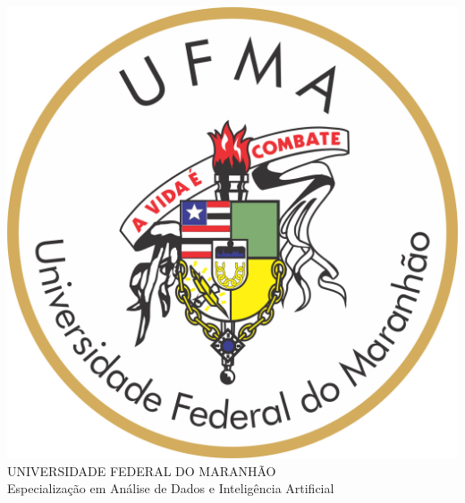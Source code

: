 \documentclass[
12pt,				%
openright,			%
oneside,			%
a4paper,			%
english,			%
french,				%
spanish,			%
brazil				%
]{abntex2}
\begin{document}

\frenchspacing 

\renewcommand{\imprimircapa}{%
\begin{capa}%
\center
\includegraphics[scale=0.25]{imagens/logoufma.png} \\ 
\vspace{1cm}
\ABNTEXchapterfont\Large UNIVERSIDADE FEDERAL DO MARANHÃO \\
\ABNTEXsectionfont\Large Especialização em Análise de Dados e Inteligência Artificial \\

\vspace*{5cm}

\begin{center}
{\ABNTEXsectionfont\Large\imprimirautor} \\
\ABNTEXchapterfont\bfseries\LARGE\imprimirtitulo
\end{center}
\vfill
\large\imprimirlocal \\
\large\imprimirdata
\vspace*{1cm}
\end{capa}
}	

\imprimircapa

\imprimirfolhaderosto

\end{document}
